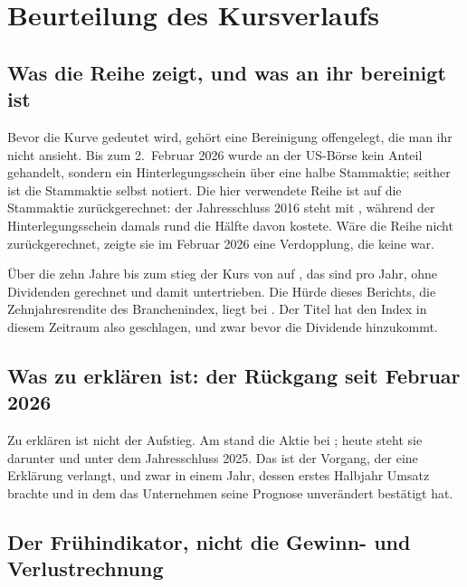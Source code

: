 \section{Beurteilung des Kursverlaufs}
\label{sec:kurs-azn}

\subsection{Was die Reihe zeigt, und was an ihr bereinigt ist}

Bevor die Kurve gedeutet wird, geh\"ort eine Bereinigung offengelegt, die man
ihr nicht ansieht. Bis zum 2.~Februar 2026 wurde an der US-B\"orse kein Anteil
gehandelt, sondern ein Hinterlegungsschein \"uber eine halbe Stammaktie; seither
ist die Stammaktie selbst notiert.
Die hier verwendete Reihe ist auf die Stammaktie zur\"uckgerechnet: der
Jahresschluss 2016 steht mit \USDje{\AznKursSchlussXVI}, w\"ahrend der
Hinterlegungsschein damals rund die H\"alfte davon kostete. W\"are die Reihe
nicht zur\"uckgerechnet, zeigte sie im Februar 2026 eine Verdopplung, die
keine war.

\"Uber die zehn Jahre bis zum \Datum{\AznKursTag} stieg der Kurs von
\USDje{\AznKursSchlussXVI} auf \USDje{\AznKurs}, das sind
\Pct{\AznRenditeZehn} pro Jahr, ohne Dividenden gerechnet und damit
untertrieben. Die H\"urde dieses Berichts, die Zehnjahresrendite des
Branchenindex, liegt bei \Pct{\Huerde}. Der Titel hat den Index in diesem
Zeitraum also geschlagen, und zwar bevor die Dividende hinzukommt.

\subsection{Was zu erkl\"aren ist: der R\"uckgang seit Februar 2026}

Zu erkl\"aren ist nicht der Aufstieg. Am \Datum{\AznKurstagHoch} stand die Aktie bei
\USDje{\AznKursHochXXVI}; heute steht sie \PctBetrag{\AznAbstandHoch} darunter
und \PctBetrag{\AznRenditeLaufend} unter dem Jahresschluss 2025. Das ist der
Vorgang, der eine Erkl\"arung verlangt, und zwar in einem Jahr, dessen erstes Halbjahr
\MioUSD{\AznUmsatzHJ} Umsatz brachte und in dem das Unternehmen seine Prognose
unver\"andert best\"atigt hat.


\subsection{Der Fr\"uhindikator, nicht die Gewinn- und Verlustrechnung}

